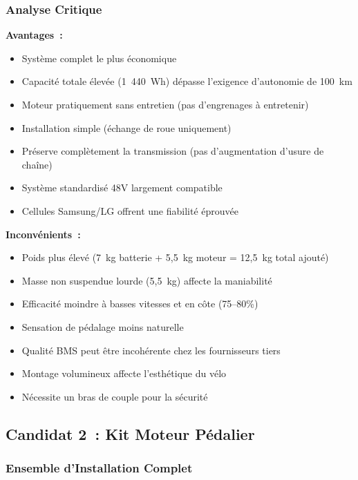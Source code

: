 \documentclass[12pt,a4paper]{article}
\begin{document}
\subsubsection{Analyse Critique}

\textbf{Avantages~:}
\begin{itemize}
    \item Système complet le plus économique
    \item Capacité totale élevée (1~440~Wh) dépasse l'exigence d'autonomie de 100~km
    \item Moteur pratiquement sans entretien (pas d'engrenages à entretenir)
    \item Installation simple (échange de roue uniquement)
    \item Préserve complètement la transmission (pas d'augmentation d'usure de chaîne)
    \item Système standardisé 48V largement compatible
    \item Cellules Samsung/LG offrent une fiabilité éprouvée
\end{itemize}

\textbf{Inconvénients~:}
\begin{itemize}
    \item Poids plus élevé (7~kg batterie + 5,5~kg moteur = 12,5~kg total ajouté)
    \item Masse non suspendue lourde (5,5~kg) affecte la maniabilité
    \item Efficacité moindre à basses vitesses et en côte (75--80\%)
    \item Sensation de pédalage moins naturelle
    \item Qualité BMS peut être incohérente chez les fournisseurs tiers
    \item Montage volumineux affecte l'esthétique du vélo
    \item Nécessite un bras de couple pour la sécurité
\end{itemize}

\subsection{Candidat 2~: Kit Moteur Pédalier}

\subsubsection{Ensemble d'Installation Complet}
\end{document}
